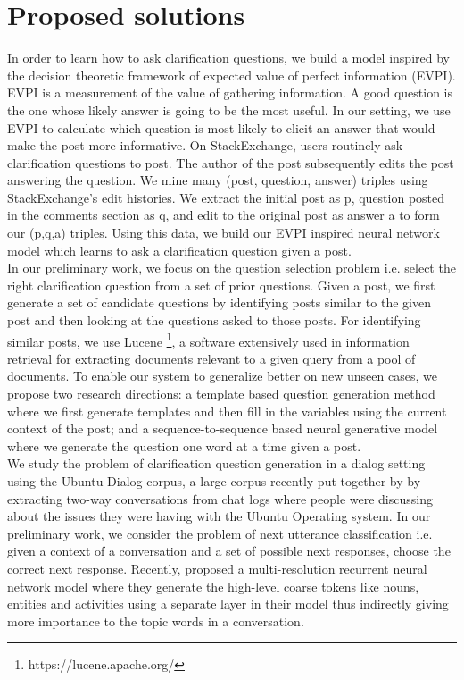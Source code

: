\documentclass[11pt]{report}
\newcommand\newcite{\citet}
\begin{document}
\section{Proposed solutions}

In order to learn how to ask clarification questions, we build a model inspired by the decision theoretic framework of expected value of perfect information (EVPI). EVPI is a measurement of the value of gathering information. A good question is the one whose likely answer is going to be the most useful. In our setting, we use EVPI to calculate which question is most likely to elicit an answer that would make the post more informative. On StackExchange, users routinely ask clarification questions to post. The author of the post subsequently edits the post answering the question. We mine many (post, question, answer) triples using StackExchange's edit histories. We extract the initial post as p, question posted in the comments section as q, and edit to the original post as answer a to form our (p,q,a) triples. Using this data, we build our EVPI inspired neural network model which learns to ask a clarification question given a post.\\

\noindent
In our preliminary work, we focus on the question selection problem i.e. select the right clarification question from a set of prior questions. Given a post, we first generate a set of candidate questions by identifying posts similar to the given post and then looking at the questions asked to those posts. For identifying similar posts, we use Lucene \footnote{https://lucene.apache.org/}, a software extensively used in information retrieval for extracting documents relevant to a given query from a pool of documents. To enable our system to generalize better on new unseen cases, we propose two research directions: a template based question generation method where we first generate templates and then fill in the variables using the current context of the post; and a sequence-to-sequence based neural generative model where we generate the question one word at a time given a post. \\

\noindent
We study the problem of clarification question generation in a dialog setting using the Ubuntu Dialog corpus, a large corpus recently put together by \newcite{} by extracting two-way conversations from chat logs where people were discussing about the issues they were having with the Ubuntu Operating system. In our preliminary work, we consider the problem of next utterance classification i.e. given a context of a conversation and a set of possible next responses, choose the correct next response. Recently, \cite{serban2016multiresolution} proposed a multi-resolution recurrent neural network model where they generate the high-level coarse tokens like nouns, entities and activities using a separate layer in their model thus indirectly giving more importance to the topic words in a conversation. \\
\end{document}

